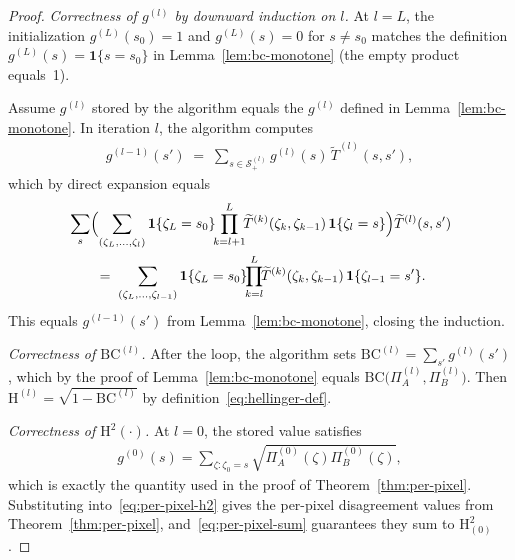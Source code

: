 \documentclass[twoside]{article}
\newcommand{\1}{\mathbf{1}}
\begin{document}
\begin{proof}
\emph{Correctness of $g^{(l)}$ by downward induction on $l$.}  At $l = L$, the initialization
$g^{(L)}(s_0) = 1$ and $g^{(L)}(s) = 0$ for $s \neq s_0$ matches the definition $g^{(L)}(s) =
    \mathbf{1}\{s = s_0\}$ in Lemma~\ref{lem:bc-monotone} (the empty product equals~1).

Assume $g^{(l)}$ stored by the algorithm equals the $g^{(l)}$ defined in
Lemma~\ref{lem:bc-monotone}.  In iteration $l$, the algorithm computes
\begin{align}
    g^{(l-1)}(s') \;=\; \sum_{s \in \mathcal{S}^{(l)}_+} g^{(l)}(s)\, \widetilde{T}^{(l)}(s, s'),
\end{align}
which by direct expansion equals
\begin{align}
    \begin{aligned}
        &\sum_s \Bigl(\sum_{(\zeta_L,\ldots,\zeta_l)} \mathbf{1}\{\zeta_L =
        s_0\}\!\!\prod_{k=l+1}^L\!\!\widetilde{T}^{(k)}(\zeta_k, \zeta_{k-1})\, \mathbf{1}\{\zeta_l =
        s\}\Bigr) \widetilde{T}^{(l)}(s, s') \\
        &\qquad=\; \sum_{(\zeta_L, \ldots, \zeta_{l-1})} \mathbf{1}\{\zeta_L =
        s_0\}\!\!\prod_{k=l}^L\!\!\widetilde{T}^{(k)}(\zeta_k, \zeta_{k-1})\, \mathbf{1}\{\zeta_{l-1} =
        s'\}.
    \end{aligned}
\end{align}
This equals $g^{(l-1)}(s')$ from Lemma~\ref{lem:bc-monotone}, closing the induction.

\emph{Correctness of $\mathrm{BC}^{(l)}$.}  After the loop, the algorithm sets $\mathrm{BC}^{(l)} =
    \sum_{s'} g^{(l)}(s')$, which by the proof of Lemma~\ref{lem:bc-monotone} equals
$\mathrm{BC}\!\bigl(\Pi^{(l)}_A, \Pi^{(l)}_B\bigr)$.  Then $\mathrm{H}^{(l)} = \sqrt{1 -
    \mathrm{BC}^{(l)}}$ by definition~\eqref{eq:hellinger-def}.

\emph{Correctness of $\mathrm{H}^2(\cdot)$.} At $l = 0$, the stored value satisfies
\begin{align}
    g^{(0)}(s)
    =
    \sum_{\zeta: \zeta_0 = s}
    \sqrt{\Pi^{(0)}_A(\zeta) \Pi^{(0)}_B(\zeta)},
\end{align}
which is exactly the quantity used in the proof of Theorem~\ref{thm:per-pixel}. Substituting
into~\eqref{eq:per-pixel-h2} gives the per-pixel disagreement values from
Theorem~\ref{thm:per-pixel}, and~\eqref{eq:per-pixel-sum} guarantees they sum to
$\mathrm{H}^{2}_{(0)}$.
\end{proof}
\end{document}
